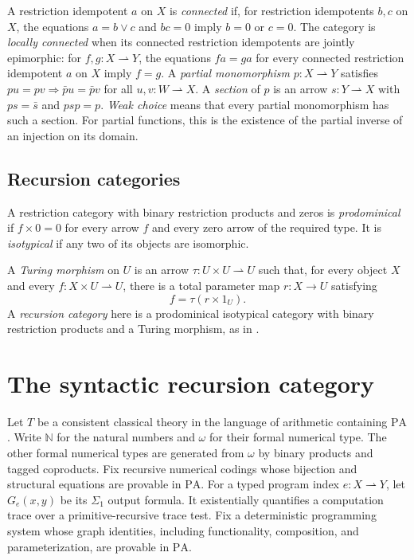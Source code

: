 \documentclass[11pt]{article}
\newcommand{\N}{\mathbb N}
\newcommand{\PA}{\mathrm{PA}}
\begin{document}
A restriction idempotent $a$ on $X$ is \emph{connected} if, for
restriction idempotents $b,c$ on $X$, the equations $a=b\vee c$ and
$bc=0$ imply $b=0$ or $c=0$. The category is \emph{locally connected}
when its connected restriction idempotents are jointly epimorphic: for
$f,g:X\rightharpoonup Y$, the equations $fa=ga$ for every connected
restriction idempotent $a$ on $X$ imply $f=g$.
A \emph{partial monomorphism} $p:X\rightharpoonup Y$ satisfies
$pu=pv\Rightarrow\bar p u=\bar p v$ for all
$u,v:W\rightharpoonup X$.
A \emph{section} of $p$ is an arrow $s:Y\rightharpoonup X$
with $ps=\bar s$ and $psp=p$.
\emph{Weak choice} means that every partial monomorphism has such
a section. For partial functions, this is the existence of the
partial inverse of an injection on its domain.

\subsection{Recursion categories}

A restriction category with binary restriction products and zeros is
\emph{prodominical} if $f\times0=0$ for every arrow $f$ and every
zero arrow of the required type. It is \emph{isotypical} if any
two of its objects are isomorphic.

A \emph{Turing morphism} on $U$ is an arrow
$\tau:U\times U\rightharpoonup U$ such that, for every object $X$
and every $f:X\times U\rightharpoonup U$, there is a total
parameter map $r:X\to U$ satisfying
\[
 f=\tau(r\times1_U).
\]
A \emph{recursion category} here is a prodominical isotypical
category with binary restriction products and a Turing morphism,
as in \cite[Section 9]{Heller}.

\section{The syntactic recursion category}\label{sec:syntactic}

Let $T$ be a consistent classical theory in the language of arithmetic
containing $\PA$. Write $\N$ for the natural numbers and $\omega$
for their formal numerical type. The other formal numerical types are
generated from $\omega$ by binary products and tagged coproducts.
Fix recursive numerical codings
whose bijection and structural equations are provable in $\PA$.
For a typed program index $e:X\rightharpoonup Y$, let $G_e(x,y)$ be its
$\Sigma_1$ output formula. It existentially quantifies a computation trace
over a primitive-recursive trace test. Fix a deterministic programming
system whose graph identities, including functionality, composition,
and parameterization, are provable in $\PA$.
\end{document}
